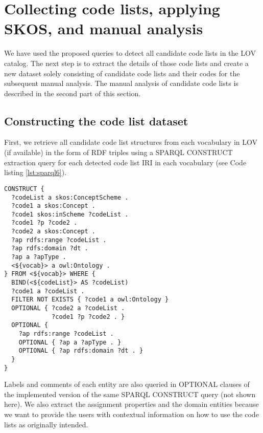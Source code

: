 \section{Collecting code lists, applying SKOS, and manual analysis}
\label{s:skos_codelist_collecting}
We have used the proposed queries to detect all candidate code lists in the LOV catalog. The next step is to extract the details of those code lists and create a new dataset solely consisting of candidate code lists and their codes for the subsequent manual analysis. The manual analysis of candidate code lists is described in the second part of this section.

\subsection{Constructing the code list dataset}
First, we retrieve all candidate code list structures from each vocabulary in LOV (if available) in the form of RDF triples using a SPARQL CONSTRUCT extraction query for each detected code list IRI in each vocabulary (see Code listing \ref{lst:sparql6}).

\begin{lstlisting}[captionpos=b, caption=Query to extract candidate code lists and annotate them with SKOS,label=lst:sparql6,basicstyle=\small\ttfamily,frame=single]
CONSTRUCT {
  ?codeList a skos:ConceptScheme .
  ?code1 a skos:Concept . 
  ?code1 skos:inScheme ?codeList .
  ?code1 ?p ?code2 .
  ?code2 a skos:Concept .
  ?ap rdfs:range ?codeList . 
  ?ap rdfs:domain ?dt .
  ?ap a ?apType .
  <${vocab}> a owl:Ontology .
} FROM <${vocab}> WHERE {
  BIND(<${codeList}> AS ?codeList)
  ?code1 a ?codeList .
  FILTER NOT EXISTS { ?code1 a owl:Ontology }
  OPTIONAL { ?code2 a ?codeList .
             ?code1 ?p ?code2 . }
  OPTIONAL {
    ?ap rdfs:range ?codeList . 
    OPTIONAL { ?ap a ?apType . }
    OPTIONAL { ?ap rdfs:domain ?dt . }
  }
}
\end{lstlisting}

Labels and comments of each entity are also queried in OPTIONAL clauses of the implemented version of the same SPARQL CONSTRUCT query (not shown here). We also extract the assignment properties and the domain entities because we want to provide the users with contextual information on how to use the code lists as originally intended. 

